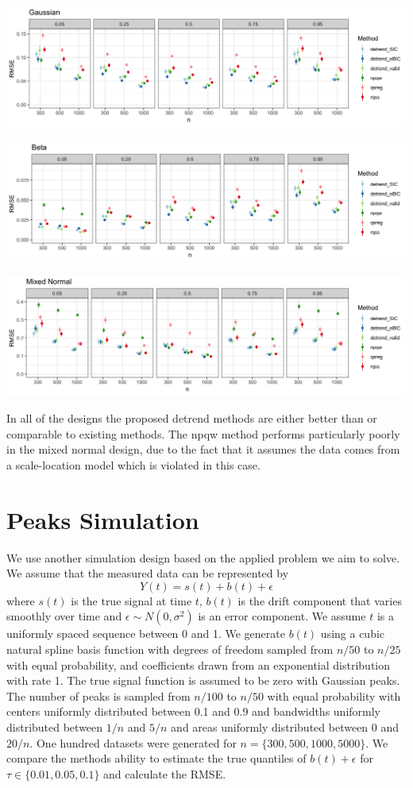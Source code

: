 \documentclass[12pt]{article}
\begin{document}
	\includegraphics[width=\linewidth]{Figures/gaus_mse.png}	
	
	\includegraphics[width=\linewidth]{Figures/shapebeta_mse.png}
	
	\includegraphics[width=\linewidth]{Figures/mixednorm_mse.png}
	
	In all of the designs the proposed detrend methods are either better than or comparable to existing methods. The npqw method performs particularly poorly in the mixed normal design, due to the fact that it assumes the data comes from a scale-location model which is violated in this case. 
	
	\section{Peaks Simulation}
	We use another simulation design based on the applied problem we aim to solve. We assume that the measured data can be represented by 
	\begin{equation}
	Y(t) = s(t) + b(t) + \epsilon
	\end{equation} 
	where $s(t)$ is the true signal at time $t$, $b(t)$ is the drift component that varies smoothly over time and $\epsilon \sim N(0, \sigma^2)$ is an error component. We assume $t$ is a uniformly spaced sequence between 0 and 1. We generate $b(t)$ using a cubic natural spline basis function with degrees of freedom sampled from $n/50$ to $n/25$ with equal probability, and coefficients drawn from an exponential distribution with rate 1. The true signal function is assumed to be zero with Gaussian peaks. The number of peaks is sampled from $n/100$ to $n/50$ with equal probability with centers uniformly distributed between 0.1 and 0.9 and bandwidths uniformly distributed between $1/n$ and $5/n$ and areas uniformly distributed between 0 and $20/n$. One hundred datasets were generated for $n=\{300,500,1000, 5000\}$. We compare the methods ability to estimate the true quantiles of $b(t) + \epsilon$  for $\tau \in \{0.01, 0.05, 0.1\}$ and calculate the RMSE. 
	
\end{document}
